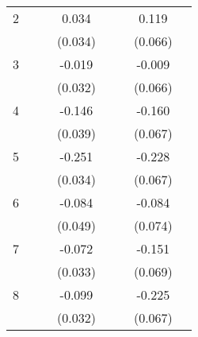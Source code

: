 \begin{longtable}{l*{3}{c}|l*{3}{c}}
		2                   &                     &                     &       0.034         &                     &                     &       0.119         \\
		&                     &                     &     (0.034)         &                     &                     &     (0.066)         \\
		3                   &                     &                     &      -0.019         &                     &                     &      -0.009         \\
		&                     &                     &     (0.032)         &                     &                     &     (0.066)         \\
		4                   &                     &                     &      -0.146\sym{***}&                     &                     &      -0.160\sym{*}  \\
		&                     &                     &     (0.039)         &                     &                     &     (0.067)         \\
		5                   &                     &                     &      -0.251\sym{***}&                     &                     &      -0.228\sym{***}\\
		&                     &                     &     (0.034)         &                     &                     &     (0.067)         \\
		6                   &                     &                     &      -0.084         &                     &                     &      -0.084         \\
		&                     &                     &     (0.049)         &                     &                     &     (0.074)         \\
		7                   &                     &                     &      -0.072\sym{*}  &                     &                     &      -0.151\sym{*}  \\
		&                     &                     &     (0.033)         &                     &                     &     (0.069)         \\
		8                   &                     &                     &      -0.099\sym{**} &                     &                     &      -0.225\sym{***}\\
		&                     &                     &     (0.032)         &                     &                     &     (0.067)         \\

\end{longtable}
